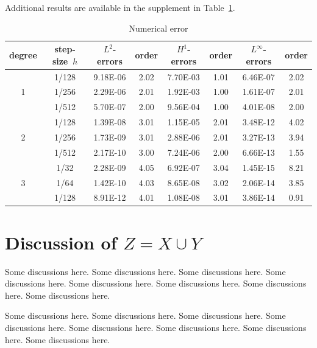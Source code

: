 \documentclass[10pt,reqno,final]{article}
\theoremstyle{plain}
\theoremstyle{definition}
\theoremstyle{remark}
\numberwithin{equation}{section}
\numberwithin{figure}{section}
\numberwithin{table}{section}
\begin{document}
Additional results are available in the supplement in Table~\ref{tab:foo}.

\begin{table}[!htp]
\centering
\renewcommand\arraystretch{1.2} %
\caption{Numerical error}
\label{tab:foo}
\begin{tabular}{c|c|cc|cc|cc}
\hline
degree &  step-size~$h$  & $L^2$-errors  &  order  & $H^1$-errors & order & $L^\infty$-errors  &  order \\
\hline
   &  1/128    & 9.18E-06    &2.02    & 7.70E-03  &1.01       & 6.46E-07    &2.02   \\
1  &  1/256    & 2.29E-06    &2.01    & 1.92E-03  &1.00       & 1.61E-07    &2.01   \\
   &  1/512    & 5.70E-07    &2.00    & 9.56E-04  &1.00       & 4.01E-08    &2.00   \\
\hline  %
   &  1/128    & 1.39E-08    &3.01    & 1.15E-05  &2.01       & 3.48E-12   &4.02    \\
2  &  1/256    & 1.73E-09    &3.01    & 2.88E-06  &2.01       & 3.27E-13   &3.94    \\
   &  1/512    & 2.17E-10    &3.00    & 7.24E-06  &2.00       & 6.66E-13   &1.55    \\
\hline  %
   &  1/32     & 2.28E-09    &4.05    & 6.92E-07  &3.04       & 1.45E-15   &8.21    \\
3  &  1/64     & 1.42E-10    &4.03    & 8.65E-08  &3.02       & 2.06E-14   &3.85    \\
   &  1/128    & 8.91E-12    &4.01    & 1.08E-08  &3.01       & 3.86E-14   &0.91    \\
\hline
\end{tabular}
\end{table}


\section{Discussion of \texorpdfstring{{\boldmath$Z=X \cup Y$}}{Z = X union Y}}
\label{sec:discussion}

Some discussions here. Some discussions here. Some discussions here. Some discussions here. Some discussions here. Some discussions here. Some discussions here. Some discussions here.

Some discussions here. Some discussions here. Some discussions here. Some discussions here. Some discussions here. Some discussions here. Some discussions here. Some discussions here.
\end{document}
